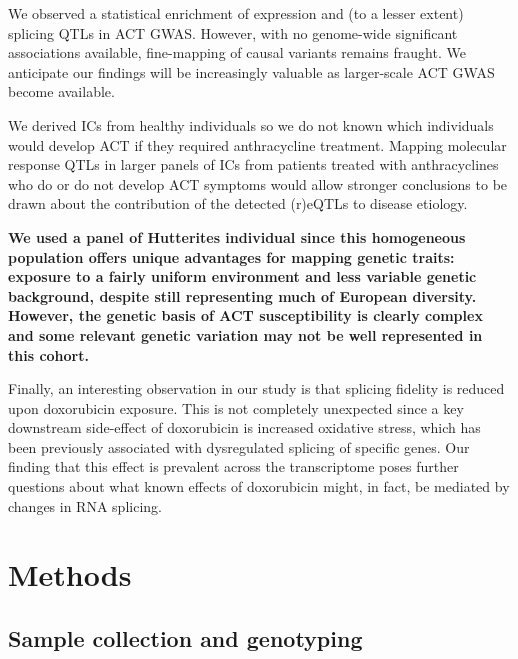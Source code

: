 \documentclass{article}
\newcommand{\tempbold}[1]{\textbf{#1}}
\begin{document}
We observed a statistical enrichment of expression and (to a lesser extent) splicing QTLs in ACT GWAS. However, with no genome-wide significant associations available, fine-mapping of causal variants remains fraught. We anticipate our findings will be increasingly valuable as larger-scale ACT GWAS become available. 

We derived ICs from healthy individuals so we do not known which individuals would develop ACT if they required anthracycline treatment. Mapping molecular response QTLs in larger panels of ICs from patients treated with anthracyclines who do or do not develop ACT symptoms would allow stronger conclusions to be drawn about the contribution of the detected (r)eQTLs to disease etiology. 

\tempbold{We used a panel of Hutterites individual since this homogeneous population offers unique advantages for mapping genetic traits: exposure to a fairly uniform environment and less variable genetic background, despite still representing much of European diversity\cite{Newman2004-ms}. However, the genetic basis of ACT susceptibility is clearly complex and some relevant genetic variation may not be well represented in this cohort.}

Finally, an interesting observation in our study is that splicing fidelity is reduced upon doxorubicin exposure. This is not completely unexpected since a key downstream side-effect of doxorubicin is increased oxidative stress, which has been previously associated with dysregulated splicing of specific genes\cite{Disher2007,Seo2016}. Our finding that this effect is prevalent across the transcriptome poses further questions about what known effects of  doxorubicin might, in fact, be mediated by changes in RNA splicing. 


\section*{Methods} 

\subsection*{Sample collection and genotyping}
\end{document}
